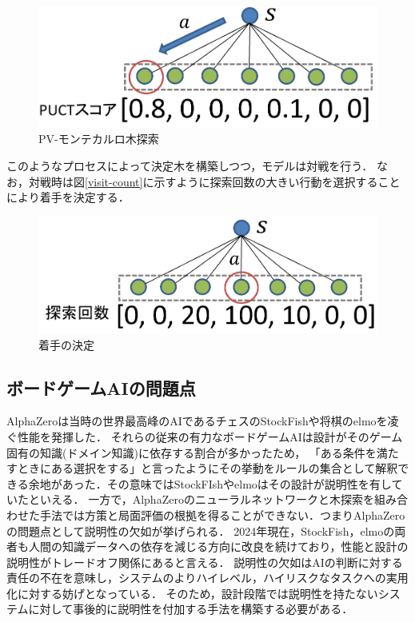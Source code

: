 \begin{figure}[htbp]
	\centering
	\includegraphics[width=\linewidth]{./figure/pv-mcts.png}
	\caption{PV-モンテカルロ木探索}
	\label{fig:pv-mcts}
\end{figure}
	
このようなプロセスによって決定木を構築しつつ，モデルは対戦を行う．
なお，対戦時は図\ref{visit-count}に示すように探索回数の大きい行動を選択することにより着手を決定する．
\begin{figure}[htbp]
	\centering
	\includegraphics[width=\linewidth]{./figure/visit-count.png}
	\caption{着手の決定}
	\label{fig:visit-count}
\end{figure}

\subsection{ボードゲームAIの問題点}
AlphaZeroは当時の世界最高峰のAIであるチェスのStockFish\cite{StockFish}や将棋のelmo\cite{elmo}を凌ぐ性能を発揮した．
それらの従来の有力なボードゲームAIは設計がそのゲーム固有の知識(ドメイン知識)に依存する割合が多かったため，
「ある条件を満たすときにある選択をする」と言ったようにその挙動をルールの集合として解釈できる余地があった．その意味ではStockFIshやelmoはその設計が説明性を有していたといえる．
一方で，AlphaZeroのニューラルネットワークと木探索を組み合わせた手法では方策と局面評価の根拠を得ることができない．つまりAlphaZeroの問題点として説明性の欠如が挙げられる．
2024年現在，StockFish，elmoの両者も人間の知識データへの依存を減じる方向に改良を続けており，性能と設計の説明性がトレードオフ関係にあると言える\cite{elmo}\cite{StockFish13}．
説明性の欠如はAIの判断に対する責任の不在を意味し，システムのよりハイレベル，ハイリスクなタスクへの実用化に対する妨げとなっている．
そのため，設計段階では説明性を持たないシステムに対して事後的に説明性を付加する手法を構築する必要がある．




